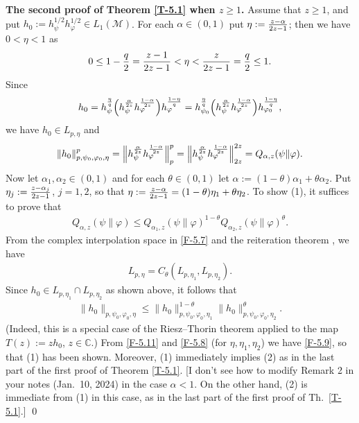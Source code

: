 \documentclass[12pt]{article}
\theoremstyle{definition}
\theoremstyle{remark}
\numberwithin{equation}{section}
\def\Me{\mathcal M}
\def\ffi{\varphi}
\def\bC{\mathbb{C}}
\begin{document}
\bigskip\noindent
{\bf The second proof of Theorem \ref{T-5.1} when $z\ge1$.}\enspace
Assume that $z\ge1$, and put $h_0:=h_\psi^{1/2}h_\ffi^{1/2}\in L_1(\Me)$. For each $\alpha\in(0,1)$ put
$\eta:={z-\alpha\over2z-1}$; then we have $0<\eta<1$ as
\[
0\le1-{q\over2}={z-1\over2z-1}<\eta<{z\over2z-1}={q\over2}\le1.
\]
Since
\[
h_0=h_\psi^{\eta\over q}\Bigl(h_\psi^{\alpha\over2z}h_\ffi^{1-\alpha\over2z}\Bigr)h_\ffi^{1-\eta\over q}
=h_{\psi_0}^{\eta\over q}\Bigl(h_\psi^{\alpha\over2z}h_\ffi^{1-\alpha\over2z}\Bigr)h_{\ffi_0}^{1-\eta\over q},
\]
we have $h_0\in L_{p,\eta}$ and
\begin{align}\label{F-5.8}
\|h_0\|_{p,\psi_0,\ffi_0,\eta}^p=\Big\|h_\psi^{\alpha\over2z}h_\ffi^{1-\alpha\over2z}\Big\|_p^p
=\Big\|h_\psi^{\alpha\over2z}h_\ffi^{1-\alpha\over2z}\Big\|_{2z}^{2z}=Q_{\alpha,z}(\psi\|\ffi).
\end{align}
Now let $\alpha_1,\alpha_2\in(0,1)$ and for each $\theta\in(0,1)$ let
$\alpha:=(1-\theta)\alpha_1+\theta\alpha_2$. Put $\eta_j:={z-\alpha_j\over2z-1}$, $j=1,2$, so that
$\eta:={z-\alpha\over2z-1}=(1-\theta)\eta_1+\theta\eta_2$. To show (1), it suffices to prove that
\begin{align}\label{F-5.9}
Q_{\alpha,z}(\psi\|\ffi)\le Q_{\alpha_1,z}(\psi\|\ffi)^{1-\theta}Q_{\alpha_2,z}(\psi\|\ffi)^\theta.
\end{align}
From the complex interpolation space in \eqref{F-5.7} and the reiteration theorem \cite{cwikel1978complex},
we have
\begin{align}\label{F-5.10}
L_{p,\eta}=C_\theta(L_{p,\eta_1},L_{p,\eta_2}).
\end{align}
Since $h_0\in L_{p,\eta_1}\cap L_{p,\eta_2}$ as shown above, it follows that
\begin{align}\label{F-5.11}
\|h_0\|_{p,\psi_0,\ffi_0,\eta}\le\|h_0\|_{p,\psi_0,\ffi_0,\eta_1}^{1-\theta}\|h_0\|_{p,\psi_0,\ffi_0,\eta_2}^\theta.
\end{align}
(Indeed, this is a special case of the Riesz--Thorin theorem applied to the map $T(z):=zh_0$, $z\in\bC$.)
From \eqref{F-5.11} and \eqref{F-5.8} (for $\eta,\eta_1,\eta_2$) we have \eqref{F-5.9}, so that (1) has been
shown. Moreover, (1) immediately implies (2) as in the last part of the first proof of Theorem \ref{T-5.1}.
{\color{red}[I don't see how to modify Remark 2 in your notes (Jan.\ 10, 2024) in the case $\alpha<1$. On
the other hand, (2) is immediate from (1) in this case, as in the last part of the first proof of Th.~\ref{T-5.1}.]}
\qed
\end{document}
